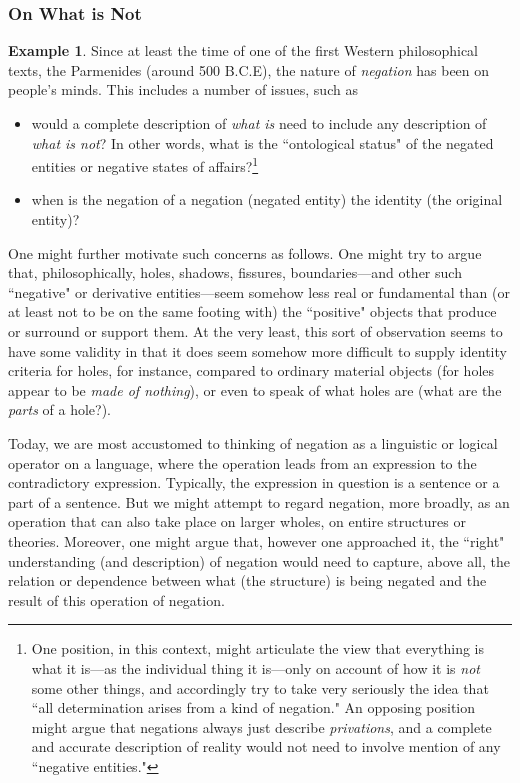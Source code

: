 \documentclass[a4paper]{book}
\theoremstyle{definition}
\newtheorem{example}{Example}[section]
\theoremstyle{definition}
\theoremstyle{definition}
\theoremstyle{theorem}
\theoremstyle{definition}
\begin{document}
\subsubsection{On What is Not}
\begin{example}	
Since at least the time of one of the first Western philosophical texts, the Parmenides (around 500 B.C.E), the nature of \textit{negation} has been on people's minds. This includes a number of issues, such as
	\begin{itemize}
		\item  would a complete description of \textit{what is} need to include any description of \textit{what is not}? In other words, what is the ``ontological status" of the negated entities or negative states of affairs?\footnote{One position, in this context, might articulate the view that everything is what it is---as the individual thing it is---only on account of how it is \textit{not} some other things, and accordingly try to take very seriously the idea that ``all determination arises from a kind of negation." An opposing position might argue that negations always just describe \textit{privations}, and a complete and accurate description of reality would not need to involve mention of any ``negative entities."}
		\item when is the negation of a negation (negated entity) the identity (the original entity)? 
	\end{itemize}
	One might further motivate such concerns as follows. One might try to argue that, philosophically, holes, shadows, fissures, boundaries---and other such ``negative" or derivative entities---seem somehow less real or fundamental than (or at least not to be on the same footing with) the ``positive" objects that produce or surround or support them. At the very least, this sort of observation seems to have some validity in that it does seem somehow more difficult to supply identity criteria for holes, for instance, compared to ordinary material objects (for holes appear to be \textit{made of nothing}), or even to speak of what holes are (what are the \textit{parts} of a hole?). \par     
	Today, we are most accustomed to thinking of negation as a linguistic or logical operator on a language, where the operation leads from an expression to the contradictory expression. Typically, the expression in question is a sentence or a part of a sentence. But we might attempt to regard negation, more broadly, as an operation that can also take place on larger wholes, on entire structures or theories. Moreover, one might argue that, however one approached it, the ``right" understanding (and description) of negation would need to capture, above all, the relation or dependence between what (the structure) is being negated and the result of this operation of negation. \par   

\end{example}
\end{document}
